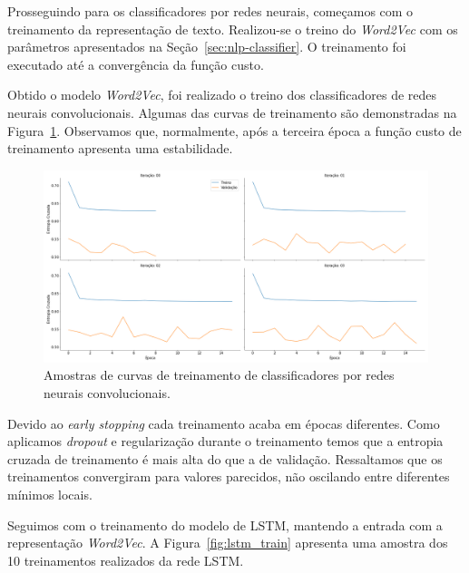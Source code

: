 Prosseguindo para os classificadores por redes neurais, começamos com o
treinamento da representação de texto.
Realizou-se o treino do \textit{Word2Vec} com os parâmetros
apresentados na Seção~\ref{sec:nlp-classifier}.
O treinamento foi executado até a convergência da função custo.

Obtido o modelo \textit{Word2Vec}, foi realizado o treino dos classificadores de
redes neurais convolucionais.
Algumas das curvas de treinamento são demonstradas na Figura~\ref{fig:cnn_train}.
Observamos que, normalmente, após a terceira época a função custo de treinamento
apresenta uma estabilidade.

\begin{figure}[h!]
\begin{center} {
    \begin{center}
    \includegraphics[scale=0.25]{images/cnn_train.png}
    \caption{Amostras de curvas de treinamento de classificadores por redes neurais
        convolucionais.}
    \label{fig:cnn_train}
    \end{center}
}
\end{center}
\end{figure}

Devido ao \textit{early stopping} cada treinamento acaba em épocas diferentes.
Como aplicamos \textit{dropout} e regularização durante o treinamento temos que
a entropia cruzada de treinamento é mais alta do que a de validação.
Ressaltamos que os treinamentos convergiram para valores parecidos, não
oscilando entre diferentes mínimos locais.

Seguimos com o treinamento do modelo de LSTM, mantendo a entrada com a
representação \textit{Word2Vec}.
A Figura~\ref{fig:lstm_train} apresenta uma amostra dos 10 treinamentos
realizados da rede LSTM.

